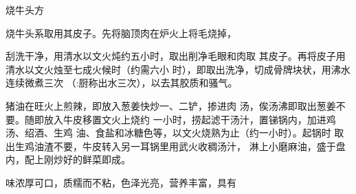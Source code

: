 \begin{recipe}{烧牛头方}

\ingredients




\cooking

烧牛头系取用其皮子。先将脑顶肉在炉火上将毛烧掉，

刮洗干净，用清水以文火炖约五小时，取出削净毛眼和肉取 其皮子。再将皮子用清水以文火烛至七成火候时（约需六小 时），即取出洗净，切成骨牌块状，用沸水连续微煮三次 （:厨称出水三次），以去其胶质和骚气。

猪油在旺火上煎辣，即放入葱姜快炒一、二铲，掺进肉 汤，俟汤沸即取出葱姜不要。随即放入牛皮移置文火上烧约 一小时，捞起滤干汤汁，置锑锅内，加进鸡汤、绍酒、生鸡 油、食盐和冰糖色等，以文火烧熟为止（约一小时）。起锅时 取出生鸡油渣不要，牛皮转入另一耳锅里用武火收稠汤汁， 淋上小磨麻油，盛于盘内，配上刚炒好的鲜菜即成。

\notes

味浓厚可口，质糯而不粘，色泽光亮，营养丰富，具有

\end{recipe}

